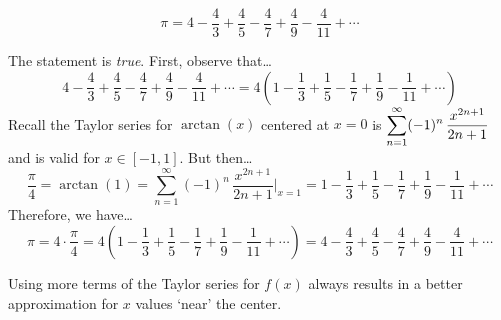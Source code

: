 \documentclass[11pt,letterpaper]{article}
\begin{document}
	\[
	\pi= 4 - \dfrac{4}{3} + \dfrac{4}{5} - \dfrac{4}{7} + \dfrac{4}{9} - \dfrac{4}{11} + \cdots
	\]

\sol The statement is \textit{true}. First, observe that\dots
	\[
	4 - \dfrac{4}{3} + \dfrac{4}{5} - \dfrac{4}{7} + \dfrac{4}{9} - \dfrac{4}{11} + \cdots= 4 \left( 1 - \dfrac{1}{3} + \dfrac{1}{5} - \dfrac{1}{7} + \dfrac{1}{9} - \dfrac{1}{11} + \cdots \right)
	\]
Recall the Taylor series for $\arctan(x)$ centered at $x= 0$ is $\displaystyle\sum_{n=1}^\infty (-1)^n \, \dfrac{x^{2n+1}}{2n + 1}$ and is valid for $x \in [-1, 1]$. But then\dots
	\[
	\dfrac{\pi}{4}= \arctan(1)= \sum_{n=1}^\infty (-1)^n \, \dfrac{x^{2n+1}}{2n + 1} \bigg|_{x=1}= 1 - \dfrac{1}{3} + \dfrac{1}{5} - \dfrac{1}{7} + \dfrac{1}{9} - \dfrac{1}{11} + \cdots
	\]
Therefore, we have\dots
	\[
	\pi= 4 \cdot \dfrac{\pi}{4}= 4 \left( 1 - \dfrac{1}{3} + \dfrac{1}{5} - \dfrac{1}{7} + \dfrac{1}{9} - \dfrac{1}{11} + \cdots \right)= 4 - \dfrac{4}{3} + \dfrac{4}{5} - \dfrac{4}{7} + \dfrac{4}{9} - \dfrac{4}{11} + \cdots
	\] \pvspace{1.3cm}



 Using more terms of the Taylor series for $f(x)$ always results in a better approximation for $x$ values `near' the center. \pspace
\end{document}
